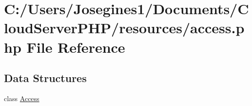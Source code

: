 \hypertarget{access_8php}{}\section{C\+:/\+Users/\+Josegines1/\+Documents/\+Cloud\+Server\+P\+H\+P/resources/access.php File Reference}
\label{access_8php}
\subsection*{Data Structures}
\begin{DoxyCompactItemize}
\item 
class \mbox{\hyperlink{class_access}{Access}}
\end{DoxyCompactItemize}
